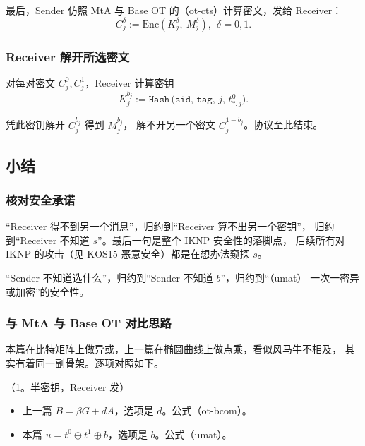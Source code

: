 最后，Sender 仿照 MtA 与 Base OT 的（ot-cts）计算密文，发给 Receiver：
\begin{equation}\label{eq:01-iknp03:6}
C_j^\delta := \mathrm{Enc}\left(K_j^\delta,~M_j^\delta\right),~~\delta=0,1.
\end{equation}

\subsubsection{Receiver 解开所选密文}

对每对密文 $C_j^0, C_j^1$，Receiver 计算密钥
\begin{equation}\label{eq:01-iknp03:7}
K_j^{b_j}:=\mathtt{Hash}\,\big(
\mathtt{sid},\,\mathtt{tag},\, j,\, t_{*,j}^0\big).
\end{equation}

凭此密钥解开 $C_j^{b_j}$ 得到 $M_j^{b_j}$，
解不开另一个密文 $C_j^{1-b_j}$。协议至此结束。

\subsection{小结}
\subsubsection{核对安全承诺}

“Receiver 得不到另一个消息”，归约到“Receiver 算不出另一个密钥”，
归约到“Receiver 不知道 $s$”。最后一句是整个 IKNP 安全性的落脚点，
后续所有对 IKNP 的攻击（见 KOS15 恶意安全）都是在想办法窥探 $s$。

“Sender 不知道选什么”，归约到“Sender 不知道 $b$”，归约到“（umat）
一次一密异或加密”的安全性。

\subsubsection{与 MtA 与 Base OT 对比思路}

本篇在比特矩阵上做异或，上一篇在椭圆曲线上做点乘，看似风马牛不相及，
其实有着同一副骨架。逐项对照如下。

（1。半密钥，Receiver 发）

\begin{itemize}

\item
  上一篇 $B=\beta G + dA$，选项是 $d$。公式（ot-bcom）。
\item
  本篇 $u={t}^0 \oplus {t}^1 \oplus b$，选项是 $b$。公式（umat）。
\end{itemize}

